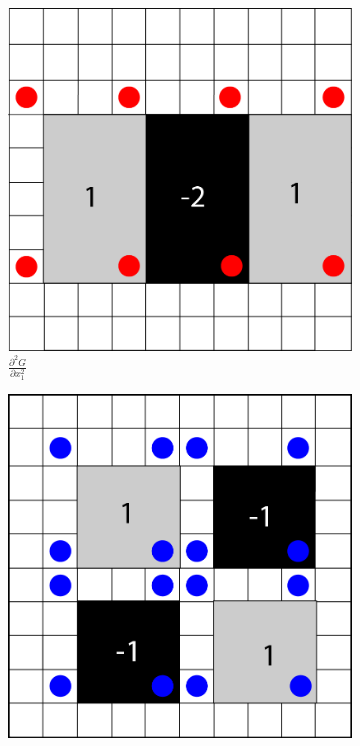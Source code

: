 \documentclass[sigconf]{acmart}
\begin{document}
\begin{figure}[h]
	\centering
	\begin{subfigure}[b]{0.3\columnwidth}
		\centering
		\includegraphics[width=\columnwidth]{figures/hessian/gaussian_second_order_kernel_xx_integral}
		\caption{$\frac{\partial^2 G}{\partial x_1^2}$}
	\end{subfigure}
	\begin{subfigure}[b]{0.3\columnwidth}
		\centering
		\includegraphics[width=\columnwidth]{figures/hessian/gaussian_second_order_kernel_xy_integral}

\end{subfigure}
\end{figure}
\end{document}
